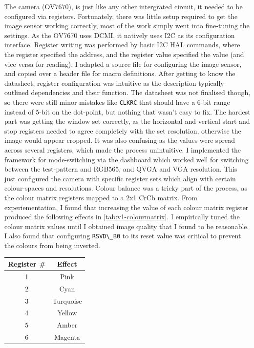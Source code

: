 The camera (\href{https://web.mit.edu/6.111/www/f2016/tools/OV7670_2006.pdf}{OV7670}), is just like any other intergrated circuit, it needed to be configured via registers. Fortunately, there was little setup required to get the image sensor working correctly, most of the work simply went into fine-tuning the settings.
\nl
As the OV7670 uses DCMI, it natively uses I2C as its configuration interface. Register writing was performed by basic I2C HAL commands, where the register specified the address, and the register value specified the value (and vice versa for reading). I adapted a source file for configuring the image sensor, and copied over a header file for macro definitions. After getting to know the datasheet, register configuration was intuitive as the description typically outlined dependencies and their function. The datasheet was not finalised though, so there were still minor mistakes like \verb|CLKRC| that should have a 6-bit range instead of 5-bit on the dot-point, but nothing that wasn't easy to fix. The hardest part was getting the window set correctly, as the horizontal and vertical start and stop registers needed to agree completely with the set resolution, otherwise the image would appear cropped. It was also confusing as the values were spread across several registers, which made the process unintuitive.
\nl
I implemented the framework for mode-switching via the dashboard which worked well for switching between the test-pattern and RGB565, and QVGA and VGA resolution. This just configured the camera with specific register sets which align with certain colour-spaces and resolutions.
\nl
Colour balance was a tricky part of the process, as the colour matrix registers mapped to a 2x1 CrCb matrix. From experiementation, I found that increasing the value of each colour matrix register produced the following effects in \autoref{tab:v1-colourmatrix}. I empirically tuned the colour matrix values until I obtained image quality that I found to be reasonable. I also found that configuring \verb|RSVD\_B0| to its reset value was critical to prevent the colours from being inverted.

\begin{indentedfigure}
    \centering
    \begin{tabular}{|c|c|}
        \hline
        \textbf{Register \#} & \textbf{Effect} \\
        \hline
        1 & Pink \\
        \hline
        2 & Cyan \\
        \hline
        3 & Turquoise \\
        \hline
        4 & Yellow \\
        \hline
        5 & Amber \\
        \hline
        6 & Magenta \\
        \hline
    \end{tabular}
    \caption{Visual effects of increasing colour matrix registers}
    \label{tab:v1-colourmatrix}
\end{indentedfigure}

